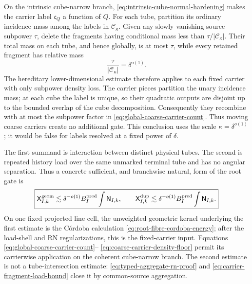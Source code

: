 \documentclass[11pt]{article}
\begin{document}
On the intrinsic cube-narrow branch,
\eqref{eq:intrinsic-cube-normal-hardening} makes the carrier label
\(\mathfrak c_Q\) a function of \(Q\).  For each tube, partition its ordinary
incidence mass among the labels in \(\mathcal C_\kappa\).  Given any slowly
vanishing source-subpower \(\tau\), delete the fragments having conditional
mass less than \(\tau/\lvert\mathcal C_\kappa\rvert\).  Their total mass on
each tube, and hence globally, is at most \(\tau\), while every retained
fragment has relative mass
\begin{equation}\label{eq:coarse-carrier-density-floor}
 \frac{\tau}{\lvert\mathcal C_\kappa\rvert}=\delta^{o(1)}.
\end{equation}
The hereditary lower-dimensional estimate therefore applies to each fixed
carrier with only subpower density loss.  The carrier pieces partition the
unary incidence mass; at each cube the label is unique, so their quadratic
outputs are disjoint up to the bounded overlap of the cube decomposition.
Consequently they recombine with at most the subpower factor in
\eqref{eq:global-coarse-carrier-count}.  Thus moving coarse carriers create no
additional gate.  This conclusion uses the scale
\(\kappa=\delta^{o(1)}\); it would be false for labels resolved at a fixed
power of \(\delta\).

The first summand is interaction between distinct physical tubes.  The
second is repeated history load over the same unmarked terminal tube and has
no angular separation.  Thus a concrete sufficient, and branchwise natural,
form of the root gate is
\begin{equation}\label{eq:two-root-subgates}
 \boxed{
 \mathsf X^{\rm geom}_{I,k}
 \lesssim\delta^{-o(1)}B_I^{\rm pred}\int\mathsf N_{I,k},
 \qquad
 \mathsf X^{\rm dup}_{I,k}
 \lesssim\delta^{-o(1)}B_I^{\rm pred}\int\mathsf N_{I,k}.}
\end{equation}
On one fixed projected line cell, the unweighted geometric kernel underlying
the first estimate is the C\'ordoba calculation
\eqref{eq:root-fibre-cordoba-energy}; after the load-shell and RN
regularizations, this is the fixed-carrier input.  Equations
\eqref{eq:global-coarse-carrier-count}--
\eqref{eq:coarse-carrier-density-floor} permit its carrierwise application on
the coherent cube-narrow branch.  The second estimate is not a
tube-intersection estimate: \eqref{eq:typed-aggregate-rn-proof} and
\eqref{eq:carrier-fragment-load-bound} close it by common-source aggregation.
\end{document}

